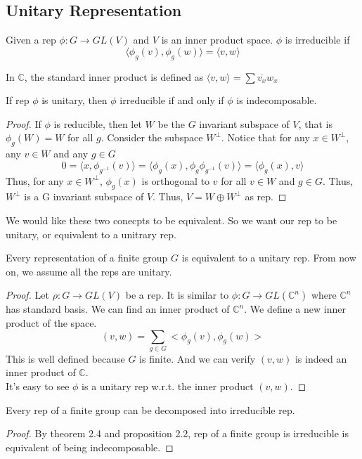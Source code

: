 \documentclass[15pt]{scrartcl}
\newcommand{\C}{\mathbb{C}}
\begin{document}
\subsection{Unitary Representation}
\begin{definition}
Given a rep $\phi: G\to GL(V)$ and $V$ is an inner product space. $\phi$ is irreducible if 
\[\langle \phi_g(v), \phi_g(w)\rangle=\langle v, w\rangle\]
\end{definition}
In $\C$, the standard inner product is defined as $\langle v,w\rangle=\sum \overline{v_x}w_x$
\begin{proposition}
If rep $\phi$ is unitary, then $\phi$ irreducible if and only if $\phi$ is indecomposable. 
\end{proposition}
\begin{proof}
If $\phi$ is reducible, then let $W$ be the $G$ invariant subspace of $V$, that is $\phi_g(W)=W$ for all $g$. Consider the subspace $W^\perp$. Notice that for any $x\in W^\perp$, any $v\in W$ and any $g\in G$
\[0=\langle x, \phi_{g^{-1}}(v)\rangle=\langle \phi_{g}(x),\phi_g\phi_{g^{-1}}(v) \rangle=\langle \phi_{g}(x),v \rangle \]
Thus, for any $x\in W^\perp $, $\phi_g(x)$ is orthogonal to $v$ for all $v\in W$ and $g\in G$. Thus, $W^\perp$ is a G invariant subspace of $V$. Thus, $V=W\oplus W^\perp$ as rep. 
\end{proof}
\begin{remark}
We would like these two conecpts to be equivalent. So we want our rep to be unitary, or equivalent to a unitrary rep. 
\end{remark}
\begin{theorem}
Every representation of a finite group $G$ is equivalent to a unitary rep. From now on, we assume all the reps are unitary. 
\end{theorem}
\begin{proof}
Let $\rho : G\to GL(V)$ be a rep. It is similar to $\phi: G\to GL(\C^n)$ where $\C^n$ has standard basis. We can find an inner product of $\C^n$.  
We define a new inner product of the space. 
\[(v,w)=\sum_{g\in G}<\phi_g(v), \phi_g(w)>\]
This is well defined because $G$ is finite. And we can verify $(v,w)$ is indeed an inner product of $\C$. 
\\

It's easy to see $\phi $ is a unitary rep w.r.t. the inner product $(v,w)$. 
\end{proof}
\begin{theorem}[Maschke]
Every rep of a finite group can be decomposed into irreducible rep.
\end{theorem}
\begin{proof}
By theorem 2.4 and proposition 2.2, rep of a finite group is irreducible is equivalent of being indecomposable. 
\end{proof}
\end{document}
